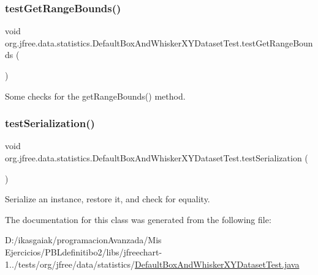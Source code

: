 \subsubsection{\texorpdfstring{test\+Get\+Range\+Bounds()}{testGetRangeBounds()}}
{\footnotesize\ttfamily void org.\+jfree.\+data.\+statistics.\+Default\+Box\+And\+Whisker\+X\+Y\+Dataset\+Test.\+test\+Get\+Range\+Bounds (\begin{DoxyParamCaption}{ }\end{DoxyParamCaption})}

Some checks for the get\+Range\+Bounds() method. \mbox{\label{classorg_1_1jfree_1_1data_1_1statistics_1_1_default_box_and_whisker_x_y_dataset_test_adc3fe8821453eba4df727be4b3d0ff71}} 
\subsubsection{\texorpdfstring{test\+Serialization()}{testSerialization()}}
{\footnotesize\ttfamily void org.\+jfree.\+data.\+statistics.\+Default\+Box\+And\+Whisker\+X\+Y\+Dataset\+Test.\+test\+Serialization (\begin{DoxyParamCaption}{ }\end{DoxyParamCaption})}

Serialize an instance, restore it, and check for equality. 

The documentation for this class was generated from the following file\+:\begin{DoxyCompactItemize}
\item 
D\+:/ikasgaiak/programacion\+Avanzada/\+Mis Ejercicios/\+P\+B\+Ldefinitibo2/libs/jfreechart-\/1../tests/org/jfree/data/statistics/\mbox{\hyperlink{_default_box_and_whisker_x_y_dataset_test_8java}{Default\+Box\+And\+Whisker\+X\+Y\+Dataset\+Test.\+java}}\end{DoxyCompactItemize}
